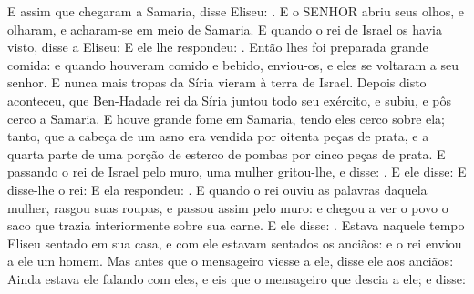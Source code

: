 {  E assim que chegaram a Samaria, disse Eliseu: . E o SENHOR abriu seus olhos, e olharam, e acharam-se em meio de Samaria.
  E quando o rei de Israel os havia visto, disse a Eliseu: 
  E ele lhe respondeu: .
  Então lhes foi preparada grande comida: e quando houveram comido e bebido, enviou-os, e eles se voltaram a seu senhor. E nunca mais tropas da Síria vieram à terra de Israel.
  Depois disto aconteceu, que Ben-Hadade rei da Síria juntou todo seu exército, e subiu, e pôs cerco a Samaria.
  E houve grande fome em Samaria, tendo eles cerco sobre ela; tanto, que a cabeça de um asno era vendida por oitenta peças de prata, e a quarta parte de uma porção de esterco de pombas por cinco peças de prata.
  E passando o rei de Israel pelo muro, uma mulher gritou-lhe, e disse: .
  E ele disse: 
  E disse-lhe o rei:  E ela respondeu: .
  E quando o rei ouviu as palavras daquela mulher, rasgou suas roupas, e passou assim pelo muro: e chegou a ver o povo o saco que trazia interiormente sobre sua carne.
  E ele disse: .
  Estava naquele tempo Eliseu sentado em sua casa, e com ele estavam sentados os anciãos: e o rei enviou a ele um homem. Mas antes que o mensageiro viesse a ele, disse ele aos anciãos: 
  Ainda estava ele falando com eles, e eis que o mensageiro que descia a ele; e disse: 
\par }

